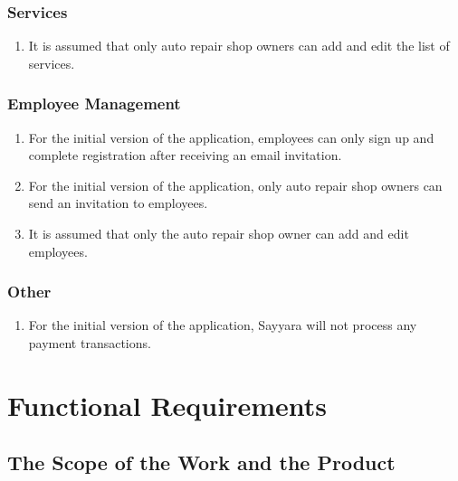 \documentclass[12pt]{article}
\begin{document}
\subsubsection{Services}
\begin{enumerate}
	\item It is assumed that only auto repair shop owners can add and edit the list of services.
\end{enumerate}

\subsubsection{Employee Management}
\begin{enumerate}
	\item For the initial version of the application, employees can only sign up and complete registration
	      after receiving an email invitation.
	\item For the initial version of the application, only auto repair shop owners can send an invitation to
	      employees.
	\item It is assumed that only the auto repair shop owner can add and edit employees.
\end{enumerate}

\subsubsection{Other}
\begin{enumerate}
	\item For the initial version of the application, Sayyara will not process any payment transactions.
\end{enumerate}

\section{Functional Requirements}

\subsection{The Scope of the Work and the Product}
\end{document}
